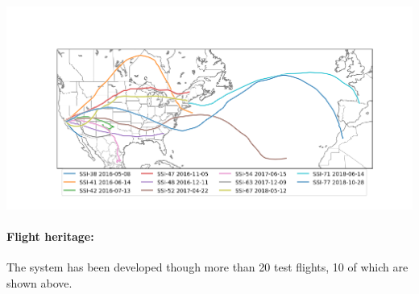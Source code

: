 \documentclass[12pt, twocolumn]{article}
\begin{document}
{\footnotesize  
\vspace{0.4cm}
\begin{center}
\noindent\includegraphics[width=\linewidth,trim={2.8cm .8cm 2cm 1.5cm},clip]{allflights.png}
\end{center}
\vspace{-.5cm} 
\paragraph{\sffamily Flight heritage:} The system has been developed though more than 20 test flights, 10 of which are shown above.%

}
\end{document}
